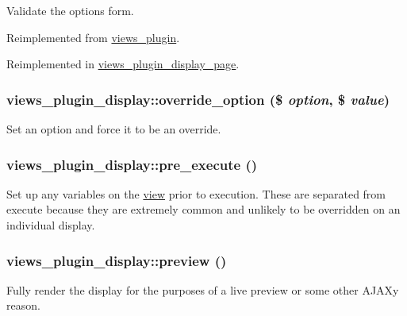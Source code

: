 Validate the options form. 

Reimplemented from \hyperlink{classviews__plugin_46d72eb35feea36fed83cd1355a47431}{views\_\-plugin}.

Reimplemented in \hyperlink{classviews__plugin__display__page_192c8feb8740fdb389600fb7a8588c27}{views\_\-plugin\_\-display\_\-page}.\hypertarget{classviews__plugin__display_1f5eb1e77d0e8754f0ae0e8092cc2190}{
\subsubsection[{override\_\-option}]{\setlength{\rightskip}{0pt plus 5cm}views\_\-plugin\_\-display::override\_\-option (\$ {\em option}, \/  \$ {\em value})}}
\label{classviews__plugin__display_1f5eb1e77d0e8754f0ae0e8092cc2190}


Set an option and force it to be an override. \hypertarget{classviews__plugin__display_04a01e109a38effdfbf77f78ecfd67ad}{
\subsubsection[{pre\_\-execute}]{\setlength{\rightskip}{0pt plus 5cm}views\_\-plugin\_\-display::pre\_\-execute ()}}
\label{classviews__plugin__display_04a01e109a38effdfbf77f78ecfd67ad}


Set up any variables on the \hyperlink{classview}{view} prior to execution. These are separated from execute because they are extremely common and unlikely to be overridden on an individual display. \hypertarget{classviews__plugin__display_39a392ae163b9d5850559e3cf098e64f}{
\subsubsection[{preview}]{\setlength{\rightskip}{0pt plus 5cm}views\_\-plugin\_\-display::preview ()}}
\label{classviews__plugin__display_39a392ae163b9d5850559e3cf098e64f}


Fully render the display for the purposes of a live preview or some other AJAXy reason. 

